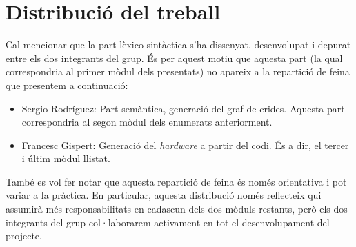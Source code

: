 
\section{Distribució del treball}
Cal mencionar que la part lèxico-sintàctica s'ha dissenyat, desenvolupat i depurat entre els dos integrants del grup. És per aquest motiu que aquesta part (la qual correspondria al primer mòdul dels presentats) no apareix a la repartició de feina que presentem a continuació:

\begin{itemize}
\item Sergio Rodríguez: Part semàntica, generació del graf de crides. Aquesta part correspondria al segon mòdul dels enumerats anteriorment.
\item Francesc Gispert: Generació del \textit{hardware} a partir del codi. És a dir, el tercer i últim mòdul llistat.
\end{itemize}

També es vol fer notar que aquesta repartició de feina és només orientativa i pot variar a la pràctica. 
En particular, aquesta distribució només reflecteix qui assumirà més 
responsabilitats en cadascun dels dos mòduls restants, però els dos integrants 
del grup col·laborarem activament en tot el desenvolupament del projecte.

